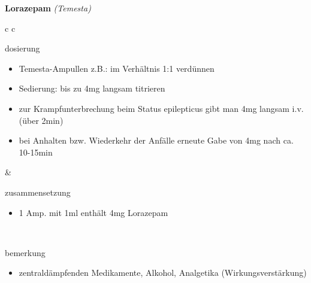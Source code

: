 \begin{frame}{
    \textbf{Lorazepam}
    \textit{(Temesta)}
}
    \begin{tabular}{c c}
        \begin{beamercolorbox}[wd=\boxwidth\textwidth,ht=\boxheight\textheight,sep=1em]{dosierung}
            \begin{itemize}
                \item Temesta-Ampullen z.B.: im Verhältnis 1:1 verdünnen
                \item Sedierung: bis zu 4mg langsam titrieren
                \item zur Krampfunterbrechung beim Status epilepticus gibt man 4mg langsam i.v. (über 2min)
                \item bei Anhalten bzw. Wiederkehr der Anfälle erneute Gabe von 4mg nach ca. 10-15min
            \end{itemize}
        \end{beamercolorbox} & 
        \begin{beamercolorbox}[wd=\boxwidth\textwidth,ht=\boxheight\textheight,sep=1em]{zusammensetzung}
            \begin{itemize}
                \item 1 Amp. mit 1ml enthält 4mg Lorazepam
            \end{itemize}
        \end{beamercolorbox} \\
        \begin{beamercolorbox}[wd=\textwidth,ht=\boxheight\textheight,sep=1em]{bemerkung}
            \begin{itemize}
                \item zentraldämpfenden Medikamente, Alkohol, Analgetika (Wirkungsverstärkung)
            \end{itemize}
        \end{beamercolorbox} \\
    \end{tabular}
\end{frame}

